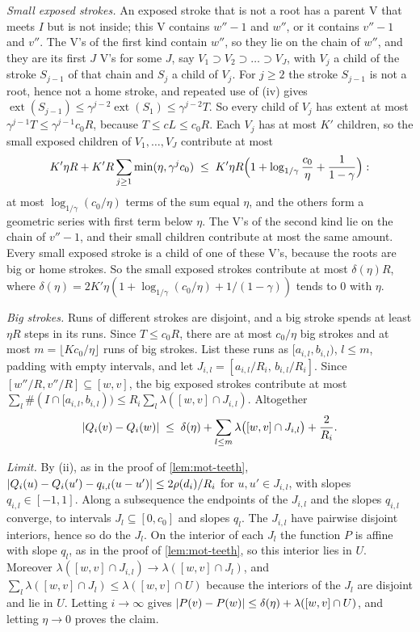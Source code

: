 \begin{informalproof}
\emph{Small exposed strokes.} An exposed stroke that is not a root has a parent V that meets $I$ but is not inside;
this V contains $w''-1$ and $w''$, or it contains $v''-1$ and $v''$. The V's of the first kind contain $w''$, so they lie
on the chain of $w''$, and they are its first $J$ V's for some $J$, say $V_1\supset V_2\supset\dots\supset V_J$, with
$V_j$ a child of the stroke $S_{j-1}$ of that chain and $S_j$ a child of $V_j$. For $j\ge2$ the stroke $S_{j-1}$ is not a
root, hence not a home stroke, and repeated use of (iv) gives $\operatorname{ext}(S_{j-1})\le\gamma^{j-2}
\operatorname{ext}(S_1)\le\gamma^{j-2}T$. So every child of $V_j$ has extent at most $\gamma^{j-1}T\le\gamma^{j-1}c_0R$,
because $T\le cL\le c_0R$. Each $V_j$ has at most $K'$ children, so the small exposed children of $V_1,\dots,V_J$
contribute at most
\[
  K'\eta R+K'R\sum_{j\ge1}\min(\eta,\gamma^jc_0)\;\le\;K'\eta R\Bigl(1+\log_{1/\gamma}\frac{c_0}{\eta}+\frac1{1-\gamma}\Bigr):
\]
at most $\log_{1/\gamma}(c_0/\eta)$ terms of the sum equal $\eta$, and the others form a geometric series with first
term below $\eta$. The V's of the second kind lie on the chain of $v''-1$, and their small children contribute at most
the same amount. Every small exposed stroke is a child of one of these V's, because the roots are big or home strokes.
So the small exposed strokes contribute at most $\delta(\eta)R$, where
$\delta(\eta)=2K'\eta(1+\log_{1/\gamma}(c_0/\eta)+1/(1-\gamma))$ tends to $0$ with $\eta$.

\emph{Big strokes.} Runs of different strokes are disjoint, and a big stroke spends at least $\eta R$ steps in its runs.
Since $T\le c_0R$, there are at most $c_0/\eta$ big strokes and at most $m=\lfloor Kc_0/\eta\rfloor$ runs of big
strokes. List these runs as $[a_{i,l},b_{i,l})$, $l\le m$, padding with empty intervals, and let
$J_{i,l}=[a_{i,l}/R_i,\,b_{i,l}/R_i]$. Since $[w''/R,v''/R]\subseteq[w,v]$, the big exposed strokes contribute at most
$\sum_l\#(I\cap[a_{i,l},b_{i,l}))\le R_i\sum_l\lambda([w,v]\cap J_{i,l})$. Altogether
\[
  \lvert Q_i(v)-Q_i(w) \rvert\;\le\;\delta(\eta)+\sum_{l\le m}\lambda\bigl([w,v]\cap J_{i,l}\bigr)+\frac2{R_i}.
\]

\emph{Limit.} By (ii), as in the proof of \cref{lem:mot-teeth}, $\lvert Q_i(u)-Q_i(u')-q_{i,l}(u-u') \rvert\le2\rho(d_i)/R_i$
for $u,u'\in J_{i,l}$, with slopes $q_{i,l}\in[-1,1]$. Along a subsequence the endpoints of the $J_{i,l}$ and the
slopes $q_{i,l}$ converge, to intervals $J_l\subseteq[0,c_0]$ and slopes $q_l$. The $J_{i,l}$ have pairwise disjoint
interiors, hence so do the $J_l$. On the interior of each $J_l$ the function $P$ is affine with slope $q_l$, as in the
proof of \cref{lem:mot-teeth}, so this interior lies in $U$. Moreover $\lambda([w,v]\cap J_{i,l})\to\lambda([w,v]\cap
J_l)$, and $\sum_l\lambda([w,v]\cap J_l)\le\lambda([w,v]\cap U)$ because the interiors of the $J_l$ are disjoint and
lie in $U$. Letting $i\to\infty$ gives $\lvert P(v)-P(w) \rvert\le\delta(\eta)+\lambda([w,v]\cap U)$, and letting $\eta\to0$
proves the claim.


\end{informalproof}
